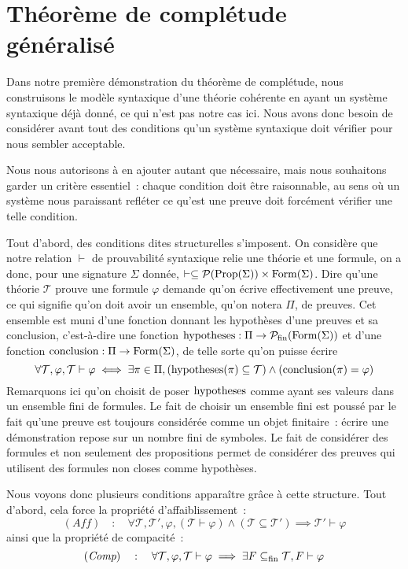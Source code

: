 \section{Théorème de complétude généralisé}

Dans notre première démonstration du théorème de complétude, nous construisons
le modèle syntaxique d'une théorie cohérente en ayant un système syntaxique
déjà donné, ce qui n'est pas notre cas ici. Nous avons donc besoin de considérer
avant tout des conditions qu'un système syntaxique doit vérifier pour nous
sembler acceptable.

Nous nous autorisons à en ajouter autant que nécessaire, mais nous souhaitons
garder un critère essentiel~: chaque condition doit être raisonnable, au sens
où un système nous paraissant refléter ce qu'est une preuve doit forcément
vérifier une telle condition.

Tout d'abord, des conditions dites structurelles s'imposent. On considère que
notre relation $\vdash$ de prouvabilité syntaxique relie une théorie et une
formule, on a donc, pour une signature $\Sigma$ donnée,
$\vdash \subseteq \mathcal{P}(\operatorname{Prop}(\Sigma))\times \operatorname{Form}(\Sigma)$. Dire qu'une
théorie $\mathcal T$ prouve une formule $\varphi$ demande qu'on écrive
effectivement une preuve, ce qui signifie qu'on doit avoir un ensemble, qu'on
notera $\Pi$, de preuves. Cet ensemble est muni d'une fonction donnant les
hypothèses d'une preuves et sa conclusion, c'est-à-dire une fonction
$\operatorname{hypotheses} : \Pi \to \mathcal{P}_{\mathrm{fin}}(\operatorname{Form}(\Sigma))$ et d'une fonction
$\operatorname{conclusion} : \Pi \to \operatorname{Form}(\Sigma)$,
de telle sorte qu'on puisse écrire
\[\forall \mathcal T, \varphi, \mathcal T \vdash \varphi \iff
\exists \pi \in \Pi, (\operatorname{hypotheses}(\pi) \subseteq \mathcal T) \land
(\operatorname{conclusion}(\pi) = \varphi)\]
Remarquons ici qu'on choisit de poser $\operatorname{hypotheses}$ comme ayant ses valeurs dans un
ensemble fini de formules. Le fait de choisir un ensemble fini est poussé par
le fait qu'une preuve est toujours considérée comme un objet finitaire~: écrire
une démonstration repose sur un nombre fini de symboles. Le fait de considérer
des formules et non seulement des propositions permet de considérer des preuves
qui utilisent des formules non closes comme hypothèses.

Nous voyons donc plusieurs conditions apparaître grâce à cette structure.
Tout d'abord, cela force la propriété d'affaiblissement~:
\[
(\textit{Aff})\quad : \quad \forall \mathcal T,\mathcal T', \varphi,
(\mathcal T \vdash \varphi) \land (\mathcal T \subseteq \mathcal T') \implies
\mathcal T' \vdash \varphi
\]
ainsi que la propriété de compacité~:
\[
(\textit{Comp})\quad : \quad \forall \mathcal T, \varphi,
\mathcal T \vdash \varphi \implies \exists F \subseteq_{\mathrm{fin}} \mathcal T,
F\vdash \varphi
\]

